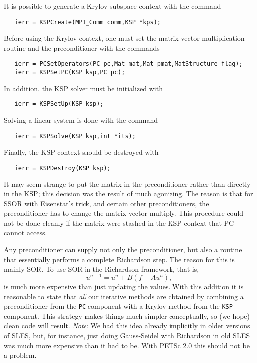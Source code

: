 It is possible to generate a Krylov subspace context with the 
command 
\begin{verbatim}
   ierr = KSPCreate(MPI_Comm comm,KSP *kps);
\end{verbatim}
Before using the Krylov context, one must set the matrix-vector multiplication routine and
the preconditioner with the 
commands  
\begin{verbatim}
   ierr = PCSetOperators(PC pc,Mat mat,Mat pmat,MatStructure flag);
   ierr = KSPSetPC(KSP ksp,PC pc);
\end{verbatim}
In addition, the KSP solver must be initialized with 
\begin{verbatim}
   ierr = KSPSetUp(KSP ksp);
\end{verbatim}
Solving a linear system is done with the command 
\begin{verbatim}
   ierr = KSPSolve(KSP ksp,int *its);
\end{verbatim}
Finally, the KSP context should be destroyed with 
\begin{verbatim}
   ierr = KSPDestroy(KSP ksp);
\end{verbatim}

It may seem strange to put the matrix in the preconditioner rather
than directly in the KSP; this decision was the result of much
agonizing. The reason is that for SSOR with Eisenstat's trick, and 
certain other preconditioners, the
preconditioner has to change the matrix-vector multiply.  This 
procedure could not
be done cleanly if the matrix were stashed in the KSP context that
PC cannot access.

Any preconditioner can supply not 
only the preconditioner, but also a routine that essentially performs a
complete Richardson step. The reason for this is mainly SOR. To 
use SOR in the Richardson framework, that is,
\[
  u^{n+1} = u^{n} + B(f - A u^{n}), 
\]
is much more expensive than just updating the values.
With this addition it is reasonable to state that {\em all} our
iterative methods are obtained by combining a preconditioner from 
the {\tt PC} component with a Krylov method from the {\tt KSP}
component. This strategy makes things much simpler conceptually, so 
(we hope)
clean code will result. {\em Note}: We had this idea already implicitly in 
older versions of SLES, but, for instance, just doing Gauss-Seidel
with Richardson in old SLES was much more expensive than it had to be. 
With PETSc 2.0 this should not be a problem. 

